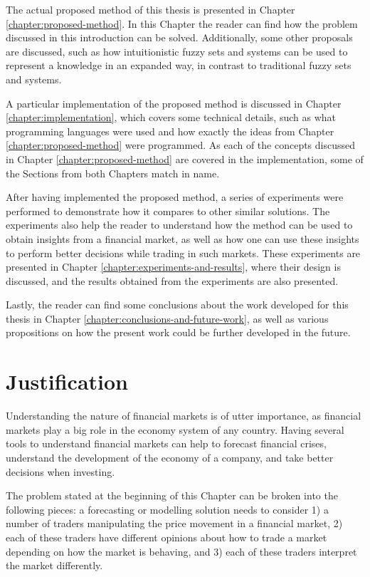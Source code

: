 The actual proposed method of this thesis is presented in Chapter
\ref{chapter:proposed-method}. In this Chapter the reader can find how the
problem discussed in this introduction can be
solved. Additionally, some other proposals are discussed, such as how
intuitionistic fuzzy sets and systems can be used to represent a knowledge in an
expanded way, in contrast to traditional fuzzy sets and systems.

A particular implementation of the proposed method is discussed in Chapter
\ref{chapter:implementation}, which covers some technical details, such as what
programming languages were used and how exactly the ideas from Chapter
\ref{chapter:proposed-method} were programmed. As each of the concepts discussed
in Chapter \ref{chapter:proposed-method} are covered in the implementation, some
of the Sections from both Chapters match in name.

After having implemented the proposed method, a series of experiments were
performed to demonstrate how it compares to other similar solutions. The
experiments also help the reader to understand how the method can be used to
obtain insights from a financial market, as well as how one can use these
insights to perform better decisions while trading in such markets. These %
experiments are presented in Chapter \ref{chapter:experiments-and-results}, where their
design is discussed, and the results obtained from the experiments are also presented.

Lastly, the reader can find some conclusions about the work developed for this
thesis in Chapter \ref{chapter:conclusions-and-future-work}, as well as various propositions on
how the present work could be further developed in the future.

\section{Justification}
\label{section:justification}

Understanding the nature of financial markets is of utter importance, as
financial markets play a big role in the economy system of any country. Having
several tools to understand financial markets can help to forecast financial
crises, understand the development of the economy of a company, and take better
decisions when investing.

The problem stated at the beginning of this Chapter can be
broken into the following pieces: a forecasting or modelling solution needs to
consider 1) a number of traders manipulating the price movement in a financial
market, 2) each of these traders have different opinions about how to trade a
market depending on how the market is behaving, and 3) each of these traders
interpret the market differently.

